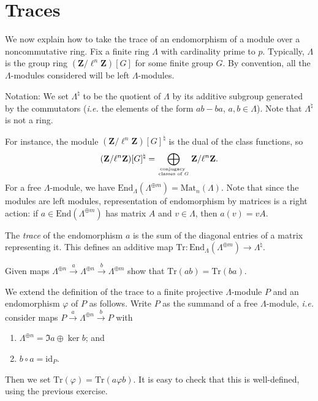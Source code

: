\section{Traces}

We now explain how to take the trace of an endomorphism of a module over a 
noncommutative ring. Fix a finite ring $\Lambda$ with cardinality prime to $p$. 
Typically, $\Lambda$ is the group ring $(\mathbf{Z}/\ell^n\mathbf{Z})[G]$ for 
some finite group $G$. By convention, all the $\Lambda$-modules considered will 
be left $\Lambda$-modules.

Notation:
We set $\Lambda^\natural$ to be the quotient of $\Lambda$ by its additive 
subgroup generated by the commutators ({\it i.e.} the elements of the form 
$ab-ba$, $a, b \in \Lambda$). Note that $\Lambda^\natural$ is not a ring. 


For instance, the module $(\mathbf{Z}/\ell^n\mathbf{Z})[G]^\natural$ is the 
dual of the class functions, so 
$$
(\mathbf{Z}/\ell^n\mathbf{Z})[G]^\natural = \bigoplus_{\text{conjugacy } \atop 
\text{classes of $G$}} \mathbf{Z}/\ell^n\mathbf{Z}.
$$ 
For a free $\Lambda$-module, we have $\text{End}_\Lambda(\Lambda^{\oplus m}) = 
\text{Mat}_n(\Lambda)$. Note that since the modules are left modules, 
representation of endomorphism by matrices is a right action: if $a \in 
\text{End}(\Lambda^{\oplus m})$ has matrix $A$ and $v \in \Lambda$, then $a(v) 
= v A$.

\begin{definition}
The {\it trace} of the endomorphism $a$ is the sum of the diagonal entries of 
a matrix representing it. This defines an additive map $\text{Tr} : 
\text{End}_\Lambda(\Lambda^{\oplus m}) \to \Lambda^\natural$.
\end{definition}

\begin{exercise} 
Given maps $\Lambda^{\oplus n} \xrightarrow{a} \Lambda^{\oplus n} 
\xrightarrow{b} \Lambda^{\oplus m}$ show that $\text{Tr}(ab) = \text{Tr}(ba)$. 
\end{exercise}

We extend the definition of the trace to a finite projective $\Lambda$-module 
$P$ and an endomorphism $\varphi$ of $P$ as follows. Write $P$ as the summand 
of a free $\Lambda$-module, {\it i.e.} consider maps $P \xrightarrow{a} 
\Lambda^{\oplus n} \xrightarrow{b} P$ with 
\begin{enumerate}
\item
$\Lambda^{\oplus n} = \Im a \oplus \ker b$; and
\item
$b\circ a = \text{id}_P$.
\end{enumerate}
Then we set $\text{Tr}(\varphi) = \text{Tr}(a\varphi b)$. It is easy to check 
that this is well-defined, using the previous exercise.

